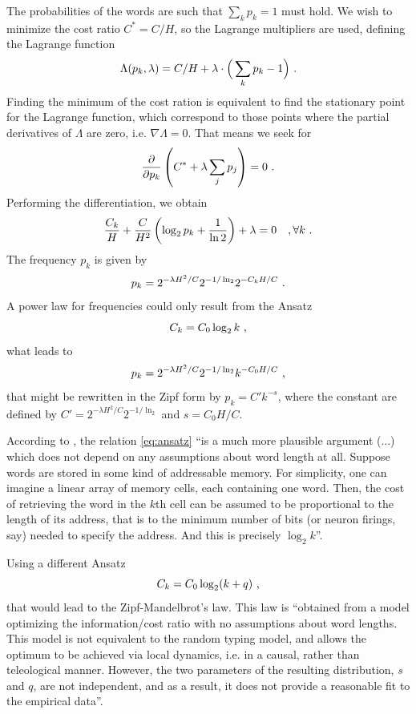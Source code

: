 The probabilities of the words are such that $\sum_k p_k = 1$ must hold.
We wish to minimize the cost ratio $C^\ast = C/H$, so the Lagrange 
multipliers are used, defining the Lagrange function 
\begin{equation}
\Lambda(p_k, \lambda) = C/H + \lambda \cdot \Big(\sum_k p_k - 1 \Big) \textmd{ .}
\end{equation}
Finding the minimum of the cost ration is equivalent to find the 
stationary point for the Lagrange function, which correspond
to those points where the partial derivatives of $\Lambda$ are zero, i.e. 
$\nabla \Lambda = 0$. That means we seek for
\begin{equation}
\frac{\partial}{\partial p_k} \left( C^\ast + \lambda \sum_j p_j \right) = 0 \textmd{ .}
\end{equation}
Performing the differentiation, we obtain
\begin{equation}
\frac{C_k}{H} + \frac{C}{H^2} \left( \log_2 p_k + \frac{1}{\ln 2}\right) + \lambda = 0 \quad , \forall k \textmd{ .}
\end{equation}
The frequency $p_k$ is given by
\begin{equation}
p_k = 2^{-\lambda H^2/C} 2^{- 1/ \ln_2} 2^{-C_k H /C} \textmd{ .}
\end{equation}
A power law for frequencies could only result from the Ansatz
\begin{equation}
\label{eq:ansatz}
C_k = C_0 \log_2 k \textmd{ ,}
\end{equation}
what leads to 
\begin{equation}
p_k = 2^{-\lambda H^2/C} 2^{- 1/ \ln_2} k^{-C_0 H/C} \textmd{ ,}
\end{equation}
that might be rewritten in the Zipf form by $p_k = C' k^{-s}$, where the constant are defined by 
$C' = 2^{-\lambda H^2/C} 2^{- 1/ \ln_2}$ and $s = C_0 H/C$.

According to \cite{manin2009}, the relation \ref{eq:ansatz} ``is a much more plausible argument
(...) which does not depend on any assumptions about word length at all.
Suppose words are stored in some kind of 
addressable memory. For simplicity, one can imagine a linear array of
memory cells, each containing one word. Then, the cost of retrieving the
word in the $k$th cell can be assumed to be proportional to the length of its
address, that is to the minimum number of bits (or neuron firings, say)
needed to specify the address. And this is precisely $\log_2 k$''\citep{manin2009}.

Using a different Ansatz
\begin{equation}
\label{eq:ansatz2}
C_k = C_0 \log_2 ( k + q) \textmd{ ,}
\end{equation}
that would lead to the Zipf-Mandelbrot's law.
This law is ``obtained from a model optimizing the information/cost ratio
with no assumptions about word lengths. This model is not equivalent to the random typing model, and
allows the optimum to be achieved via local dynamics, i.e. in a causal,
rather than teleological manner. However, the two parameters of the
resulting distribution, $s$ and $q$, are not independent, and as a result, it
does not provide a reasonable fit to the empirical data''\citep{manin2009}.



